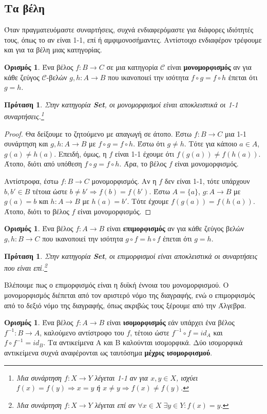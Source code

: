\documentclass [a4paper,11pt] {book}
\newtheorem{proposition}[theorem]{Πρόταση}
\theoremstyle{definition}
\theoremstyle{definition}
\newtheorem{definition}[theorem]{Ορισμός}
\newenvironment{remark}[1][Παρατήρηση]{\begin{trivlist}
\item[\hskip \labelsep {\bfseries #1}]}{\end{trivlist}}
\begin{document}
\subsection{Τα βέλη}
Όταν πραγματευόμαστε συναρτήσεις, συχνά ενδιαφερόμαστε για διάφορες ιδιότητές τους, όπως το αν είναι 1-1, επί ή αμφιμονοσήμαντες. Αντίστοιχο ενδιαφέρον τρέφουμε και για τα βέλη μιας κατηγορίας.
\begin{definition}\label{mono}
Ένα βέλος $f:B \to C$ σε μια κατηγορία $\mathcal{C}$ είναι \textbf{μονομορφισμός} αν για κάθε ζεύγος $\mathcal{C}$-βελών $g,h: A \to B$ που ικανοποιεί την ισότητα $f \circ g=f \circ h$ έπεται ότι $g=h$.
\end{definition}
\begin{proposition}\label{monoInSet}
Στην κατηγορία \textbf{Set}, οι μονομορφισμοί είναι αποκλειστικά οι 1-1 συναρτήσεις.\footnote{Μια συνάρτηση $f:X\to Y$ λέγεται 1-1 αν για $x,y \in X$, ισχύει $f(x)=f(y)\Rightarrow x=y$ ή $x\neq y\Rightarrow f(x)\neq f(y)$.}
\end{proposition}
\begin{proof}
Θα δείξουμε το ζητούμενο με απαγωγή σε άτοπο. Έστω $f:B \to C$ μια 1-1 συνάρτηση και $g,h:A\to B$ με $f\circ g=f \circ h$. Έστω ότι $g \neq h$. Τότε για κάποιο $a\in A$, $g(a)\neq h(a)$. Επειδή, όμως, η $f$ είναι 1-1 έχουμε ότι $f(g(a))\neq f(h(a))$. Άτοπο, διότι από υπόθεση $f\circ g=f \circ h$. Άρα, το βέλος $f$ είναι μονομορφισμός.

Αντίστροφα, έστω $f:B \to C$ μονομορφισμός. Αν η $f$ δεν είναι 1-1, τότε υπάρχουν $b,b'\in B$ τέτοια ώστε $b\neq b'\Rightarrow f(b)=f(b')$. Έστω $A=\{a\}$, $g:A\to B$ με $g(a)=b$ και $h:A\to B$ με $h(a)=b'$. Τότε έχουμε $f(g(a))=f(h(a))$. Άτοπο, διότι το βέλος $f$ είναι μονομορφισμός.
\end{proof}
\begin{definition}\label{epi}
Ένα βέλος $f:A \to B$ είναι \textbf{επιμορφισμός} αν για κάθε ζεύγος βελών $g,h:B \to C$ που ικανοποιεί την ισότητα $g \circ f=h \circ f$ έπεται ότι $g=h$.
\end{definition}
\begin{proposition}\label{epiInSet}
Στην κατηγορία \textbf{Set}, οι επιμορφισμοί είναι αποκλειστικά οι συναρτήσεις που είναι επί.\footnote{Μια συνάρτηση $f:X \to Y$ λέγεται επί αν $\forall x\in X \; \exists y\in Y : f(x)=y$.}
\end{proposition}
\begin{remark}
Βλέπουμε πως ο επιμορφισμός είναι η δυϊκή έννοια του μονομορφισμού. Ο μονομορφισμός διέπεται από τον αριστερό νόμο της διαγραφής, ενώ ο επιμορφισμός από το δεξιό νόμο της διαγραφής, όπως ακριβώς τους ξέρουμε από την Άλγεβρα.
\end{remark}
\begin{definition}\label{iso}
Ένα βέλος $f:A \to B$ είναι \textbf{ισομορφισμός} εάν υπάρχει ένα βέλος $f^{-1}: B\to A$, καλούμενο αντίστροφο του $f$, τέτοιο ώστε $f^{-1}\circ f=id_{A}$ και $f\circ f^{-1}=id_{B}$. Τα αντικείμενα Α και Β καλούνται ισομορφικά. Δύο ισομορφικά αντικείμενα συχνά αναφέρονται ως ταυτόσημα \textbf{μέχρις ισομορφισμού}.
\end{definition}
\end{document}

